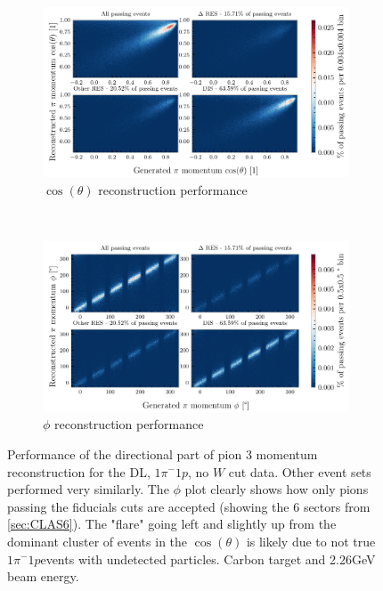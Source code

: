 \documentclass[a4paper,12pt]{article}
\newcommand{\md}{$1\pi^-1p$}
\begin{document}
\begin{appendices}
    \begin{figure}[H]
        \centering
        \begin{subfigure}{\textwidth}
            \centering
            \includegraphics{figures/python/vs_ct_C_m_dl.pdf}
            \caption{$\cos(\theta)$ reconstruction performance}
        \end{subfigure}
        \\
        \begin{subfigure}{\textwidth}
            \centering
            \includegraphics{figures/python/vs_phi_C_m_dl.pdf}
            \caption{$\phi$ reconstruction performance}
        \end{subfigure}{\textwidth}
        \caption{
            Performance of the directional part of pion 3 momentum reconstruction for the DL, \md, no $W$ cut data.
            Other event sets performed very similarly.
            The $\phi$ plot clearly shows how only pions passing the fiducials cuts are accepted (showing the 6 sectors from \cref{sec:CLAS6}).
            The "flare" going left and slightly up from the dominant cluster of events in the $\cos(\theta)$ is likely due to not true \md events with undetected particles.
            Carbon target and 2.26\si{GeV} beam energy.
        }\label{fig:vs_dir_dl}
    \end{figure}


\end{appendices}
\end{document}
